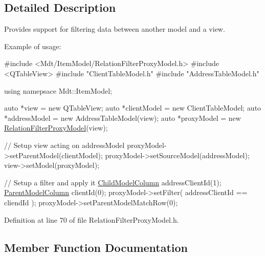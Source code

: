 \subsection{Detailed Description}
Provides support for filtering data between another model and a view. 

Example of usage\+: 
\begin{DoxyCode}
\textcolor{preprocessor}{#include <Mdt/ItemModel/RelationFilterProxyModel.h>}
\textcolor{preprocessor}{#include <QTableView>}
\textcolor{preprocessor}{#include "ClientTableModel.h"}
\textcolor{preprocessor}{#include "AddressTableModel.h"}

\textcolor{keyword}{using} namepsace Mdt::ItemModel;

\textcolor{keyword}{auto} *view = \textcolor{keyword}{new} QTableView;
\textcolor{keyword}{auto} *clientModel = \textcolor{keyword}{new} ClientTableModel;
\textcolor{keyword}{auto} *addressModel = \textcolor{keyword}{new} AddressTableModel(view);
\textcolor{keyword}{auto} *proxyModel = \textcolor{keyword}{new} \hyperlink{class_mdt_1_1_item_model_1_1_relation_filter_proxy_model_ac7b4404a6b4a87c1b083d53716fb0d43}{RelationFilterProxyModel}(view);

\textcolor{comment}{// Setup view acting on addressModel}
proxyModel->setParentModel(clientModel);
proxyModel->setSourceModel(addressModel);
view->setModel(proxyModel);

\textcolor{comment}{// Setup a filter and apply it}
\hyperlink{namespace_mdt_1_1_item_model_a60ac754611ae43e31bbe5244b2d24297}{ChildModelColumn} addressClientId(1);
\hyperlink{namespace_mdt_1_1_item_model_a65a3c4f6cfb3d80d7f69e58cd17d8be7}{ParentModelColumn} clientId(0);
proxyModel->setFilter( addressClientId == cliendId );
proxyModel->setParentModelMatchRow(0);
\end{DoxyCode}
 

Definition at line 70 of file Relation\+Filter\+Proxy\+Model.\+h.



\subsection{Member Function Documentation}
